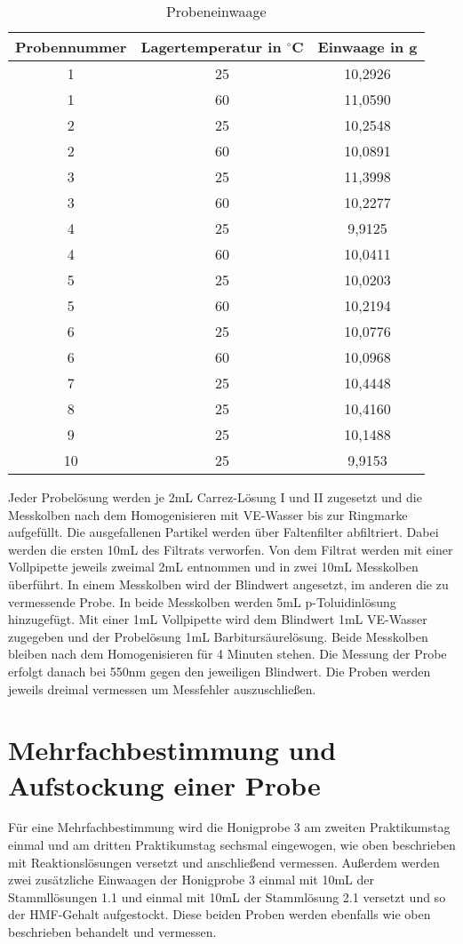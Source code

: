 \begin{table}[htbp]
	\centering
		\begin{tabular}{c|c|c} 
			Probennummer & Lagertemperatur in $^\circ$C & Einwaage in g\\
			\hline
			1 & 25 & 10,2926\\
			\hline
			1 & 60 & 11,0590\\
			\hline
			2 & 25 & 10,2548\\
			\hline
			2 & 60 & 10,0891\\
			\hline
			3 & 25 & 11,3998\\
			\hline
			3 & 60 & 10,2277\\
			\hline
			4 & 25 & 9,9125\\
			\hline
			4 & 60 & 10,0411\\
			\hline
			5 & 25 & 10,0203\\
			\hline
			5 & 60 & 10,2194\\
			\hline
			6 & 25 & 10,0776\\
			\hline
			6 & 60 & 10,0968\\
			\hline
			7 & 25 & 10,4448\\
			\hline
			8 & 25 & 10,4160\\
			\hline
			9 & 25 & 10,1488\\
			\hline
			10 & 25 & 9,9153\\
		\end{tabular}
	\caption{Probeneinwaage}
	\label{tab:Probeneinwaage}
\end{table}

Jeder Probelösung werden je 2mL Carrez-Lösung I und II zugesetzt und die Messkolben nach dem Homogenisieren mit VE-Wasser bis zur Ringmarke aufgefüllt. Die ausgefallenen Partikel werden über Faltenfilter abfiltriert. Dabei werden die ersten 10mL des Filtrats verworfen. Von dem Filtrat werden mit einer Vollpipette jeweils zweimal 2mL entnommen und in zwei 10mL Messkolben überführt. In einem Messkolben wird der Blindwert angesetzt, im anderen die zu vermessende Probe. In beide Messkolben werden 5mL p-Toluidinlösung hinzugefügt. Mit einer 1mL Vollpipette wird dem Blindwert 1mL VE-Wasser zugegeben und der Probelösung 1mL Barbitursäurelösung. Beide Messkolben bleiben nach dem Homogenisieren für 4 Minuten stehen. Die Messung der Probe erfolgt danach bei 550nm gegen den jeweiligen Blindwert. Die Proben werden jeweils dreimal vermessen um Messfehler auszuschließen.

\section{Mehrfachbestimmung und Aufstockung einer Probe}

Für eine Mehrfachbestimmung wird die Honigprobe 3 am zweiten Praktikumstag einmal und am dritten Praktikumstag sechsmal eingewogen, wie oben beschrieben mit Reaktionslösungen versetzt und anschließend vermessen. Außerdem werden zwei zusätzliche Einwaagen der Honigprobe 3 einmal mit 10mL der Stammllösungen 1.1 und einmal mit 10mL der Stammlösung 2.1 versetzt und so der HMF-Gehalt aufgestockt. Diese beiden Proben werden ebenfalls wie oben beschrieben behandelt und vermessen.
